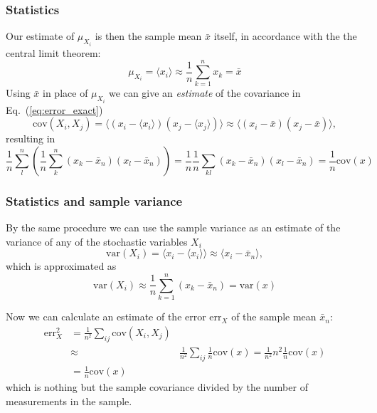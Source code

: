 \documentclass{beamer}
\begin{document}
\begin{frame}
\frametitle{Statistics}

\begin{block}{}
Our estimate of $\mu_{X_i}^{\phantom X}$ is then the sample mean $\bar x$
itself, in accordance with the the central limit theorem:
\[
\mu_{X_i}^{\phantom X} = \langle x_i\rangle \approx \frac{1}{n}\sum_{k=1}^n x_k = \bar x
\]
Using $\bar x$ in place of $\mu_{X_i}^{\phantom X}$ we can give an
\emph{estimate} of the covariance in Eq.~(\ref{eq:error_exact})
\[
\mathrm{cov}(X_i, X_j) = \langle (x_i-\langle x_i\rangle)(x_j-\langle x_j\rangle)\rangle
\approx\langle (x_i - \bar x)(x_j - \bar{x})\rangle,
\]
resulting in
\[ 
\frac{1}{n} \sum_{l}^n \left(\frac{1}{n}\sum_{k}^n (x_k -\bar x_n)(x_l - \bar x_n)\right)=\frac{1}{n}\frac{1}{n} \sum_{kl} (x_k -\bar x_n)(x_l - \bar x_n)=\frac{1}{n}\mathrm{cov}(x)
\]
\end{block}
\end{frame}

\begin{frame}
\frametitle{Statistics and sample variance}

\begin{block}{}
By the same procedure we can use the sample variance as an
estimate of the variance of any of the stochastic variables $X_i$
\[
\mathrm{var}(X_i)=\langle x_i - \langle x_i\rangle\rangle \approx \langle x_i - \bar x_n\rangle\nonumber,
\]
which is approximated as 
\begin{equation}
\mathrm{var}(X_i)\approx \frac{1}{n}\sum_{k=1}^n (x_k - \bar x_n)=\mathrm{var}(x)
\label{eq:var_estimate_i_think}
\end{equation}

Now we can calculate an estimate of the error
$\mathrm{err}_X^{\phantom X}$ of the sample mean $\bar x_n$:
\begin{align}
\mathrm{err}_X^2
&=\frac{1}{n^2}\sum_{ij} \mathrm{cov}(X_i, X_j) \nonumber \\
&\approx&\frac{1}{n^2}\sum_{ij}\frac{1}{n}\mathrm{cov}(x) =\frac{1}{n^2}n^2\frac{1}{n}\mathrm{cov}(x)\nonumber\\
&=\frac{1}{n}\mathrm{cov}(x)
\label{eq:error_estimate}
\end{align}
which is nothing but the sample covariance divided by the number of
measurements in the sample.
\end{block}
\end{frame}
\end{document}
